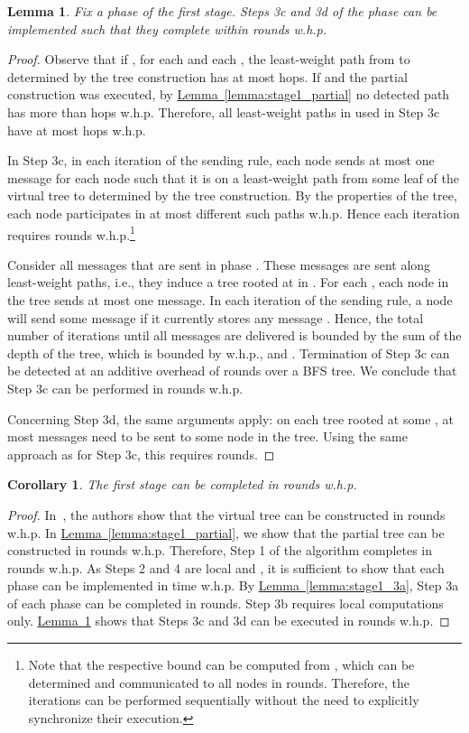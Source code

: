 \documentclass[letterpaper,11pt]{article}
\newtheorem{lemma}[theorem]{Lemma}
\newtheorem{corollary}[theorem]{Corollary}
\newcommand{\namedref}[2]{\hyperref[#2]{#1~\ref*{#2}}}
\newcommand{\lemmaref}[1]{\namedref{Lemma}{#1}}
\begin{document}
\begin{lemma}\label{lemma:stage1_3cd}
Fix a phase  of the first stage. Steps 3c and 3d of the
phase can be implemented such that they complete within
 rounds w.h.p.
\end{lemma}
\begin{proof}
Observe that if , for each  and each , the least-weight path from  to  determined by the tree
construction has at most  hops. If  and the partial construction
was executed, by \lemmaref{lemma:stage1_partial} no detected path has more than
 hops w.h.p. Therefore, all least-weight paths in
 used in Step 3c have at most  hops w.h.p.

In Step 3c, in each iteration of the sending rule, each node sends at most one
message for each node  such that it is on a least-weight path from some leaf
of the virtual tree to  determined by the tree construction. By the
properties of the tree, each node  participates in at most 
different such paths w.h.p. Hence each iteration requires  rounds
w.h.p.\footnote{Note that the respective bound can be computed from , which
can be determined and communicated to all nodes in  rounds. Therefore,
the iterations can be performed sequentially without the need to explicitly
synchronize their execution.}

Consider all messages  that are sent in phase . These messages are
sent along least-weight paths, i.e., they induce a tree rooted at  in .
For each , each node in the tree sends at most one message. In
each iteration of the sending rule, a node will send some message  if
it currently stores any message . Hence,
the total number of iterations until all messages  are delivered is
bounded by the sum of the depth of the tree, which is bounded by 
w.h.p., and . Termination of Step 3c can be detected at an additive
overhead of  rounds over a BFS tree. We conclude that Step 3c can be
performed in  rounds w.h.p.

Concerning Step 3d, the same arguments apply: on each tree rooted at some ,
at most  messages need to be sent to some node 
in the tree. Using the same approach as for Step 3c, this requires
 rounds.
\end{proof}

\begin{corollary}\label{coro:stage1_time}
The first stage can be completed in 
rounds w.h.p.
\end{corollary}
\begin{proof}
In~\cite{KKMPT-12}, the authors show that the virtual tree can be constructed in
 rounds w.h.p. In \lemmaref{lemma:stage1_partial}, we show that
the partial tree can be constructed in  rounds w.h.p.
Therefore, Step 1 of the algorithm completes in
 rounds w.h.p. As Steps 2 and 4 are local
and , it is sufficient to show that each phase
can be implemented in time  w.h.p. By
\lemmaref{lemma:stage1_3a}, Step 3a of each phase can be completed in 
rounds. Step 3b requires local computations only. \lemmaref{lemma:stage1_3cd}
shows that Steps 3c and 3d can be executed in 
rounds w.h.p.
\end{proof}
\end{document}
